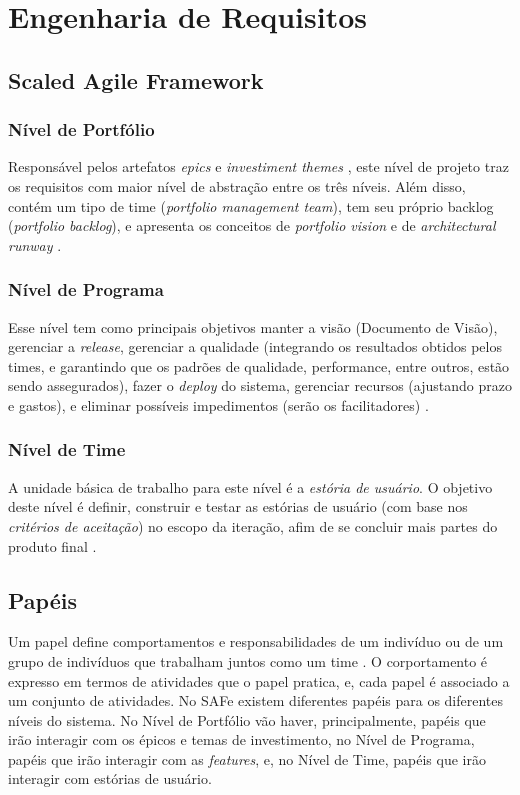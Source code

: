 \chapter[Engenharia de Requisitos]{Engenharia de Requisitos}

\section{Scaled Agile Framework}
\subsection{Nível de Portfólio}
Responsável pelos artefatos \emph{epics} e \emph{investiment themes} \cite{safe005}, este nível de projeto traz os requisitos com maior nível de abstração entre os três níveis. Além disso, contém um tipo de time (\emph{portfolio management team}), tem seu próprio backlog (\emph{portfolio backlog}), e apresenta os conceitos de \emph{portfolio vision} e de \emph{architectural runway} \cite{safe005}.

\subsection{Nível de Programa}
Esse nível tem como principais objetivos manter a visão (Documento de Visão), gerenciar a \emph{release}, gerenciar a qualidade (integrando os resultados obtidos pelos times, e garantindo que os padrões de qualidade, performance, entre outros, estão sendo assegurados), fazer o \emph{deploy} do sistema, gerenciar recursos (ajustando prazo e gastos), e eliminar possíveis impedimentos (serão os facilitadores) \cite{safe002}.

\subsection{Nível de Time}
A unidade básica de trabalho para este nível é a \emph{estória de usuário}. O objetivo deste nível é definir, construir e testar as estórias de usuário (com base nos \emph{critérios de aceitação}) no escopo da iteração, afim de se concluir mais partes do produto final \cite{safe001}.

\section{Papéis}
Um papel define comportamentos e responsabilidades de um indivíduo ou de um grupo de indivíduos que trabalham juntos como um time \cite{kruchten002}. O corportamento é expresso em termos de atividades que o papel pratica, e, cada papel é associado a um conjunto de atividades. No SAFe existem diferentes papéis para os diferentes níveis do sistema. No Nível de Portfólio vão haver, principalmente, papéis que irão interagir com os épicos e temas de investimento, no Nível de Programa, papéis que irão interagir com as \emph{features}, e, no Nível de Time, papéis que irão interagir com estórias de usuário.

